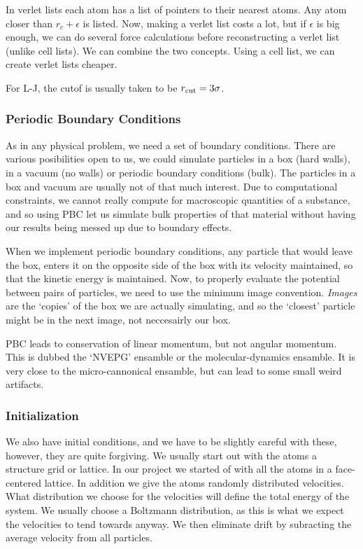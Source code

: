 \documentclass[a4paper, 11pt, notitlepage, english]{article}
\newcommand{\eps}{\epsilon}
\begin{document}
In verlet lists each atom has a list of pointers to their nearest atoms. Any atom closer than $r_c + \eps$ is listed. Now, making a verlet list costs a lot, but if $\eps$ is big enough, we can do several force calculations before reconstructing a verlet list (unlike cell lists). We can combine the two concepts. Using a cell list, we can create verlet lists cheaper.

For L-J, the cutof is usually taken to be $r_{\rm cut} = 3\sigma$.

\subsubsection*{Periodic Boundary Conditions}

As in any physical problem, we need a set of boundary conditions. There are various posibilities open to us, we could simulate particles in a box (hard walls), in a vacuum (no walls) or periodic boundary conditions (bulk). The particles in a box and vacuum are usually not of that much interest. Due to computational constraints, we cannot really compute for macroscopic quantities of a substance, and so using PBC let us simulate bulk properties of that material without having our results being messed up due to boundary effects.

When we implement periodic boundary conditions, any particle that would leave the box, enters it on the opposite side of the box with its velocity maintained, so that the kinetic energy is maintained. Now, to properly evaluate the potential between pairs of particles, we need to use the minimum image convention. \emph{Images} are the `copies' of the box we are actually simulating, and so the `closest' particle might be in the next image, not neccesairly our box.

PBC leads to conservation of linear momentum, but not angular momentum. This is dubbed the `NVEPG' ensamble or the molecular-dynamics ensamble. It is very close to the micro-cannonical ensamble, but can lead to some small weird artifacts.

\subsubsection*{Initialization}

We also have initial conditions, and we have to be slightly careful with these, however, they are quite forgiving. We usually start out with the atoms a structure grid or lattice. In our project we started of with all the atoms in a face-centered lattice. In addition we give the atoms randomly distributed velocities. What distribution we choose for the velocities will define the total energy of the system. We usually choose a Boltzmann distribution, as this is what we expect the velocities to tend towards anyway. We then eliminate drift by subracting the average velocity from all particles.
\end{document}
